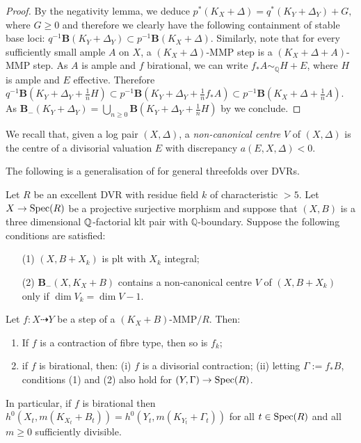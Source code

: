 	\begin{proof}
		By the negativity lemma, we deduce $p^*(K_X+\Delta)=q^*(K_Y+\Delta_Y)+G,$ where $G \geq 0$ and therefore we clearly have the following containment of stable base loci: $q^{-1}\mathbf{B}(K_Y+\Delta_Y) \subset p^{-1}\mathbf{B}(K_X+\Delta).$
		Similarly, note that for every sufficiently small ample $A$ on $X$,
		a $(K_X+\Delta)$-MMP step is a $(K_X+\Delta+A)$-MMP step. As $A$ is ample and $f$ birational, we can write $f_*A \sim_{\mathbb{Q}} H+E$, where $H$ is ample and $E$ effective. 
		Therefore  $q^{-1}\mathbf{B}(K_Y+\Delta_Y+\frac{1}{n}H) \subset p^{-1}\mathbf{B}(K_Y+\Delta_Y+ \frac{1}{n}f_*A)\subset  p^{-1}\mathbf{B}(K_X+\Delta+ \frac{1}{n}A) $.
		As $\mathbf{B}_{-}(K_Y+\Delta_Y)=\bigcup_{n \geq 0} \mathbf{B}(K_Y+\Delta_Y+\frac{1}{n}H)$ by \cite[Proposition 1.19]{asympt-baseloci} we conclude.
	\end{proof}

	We recall that, given a log pair $(X,\Delta)$, a \emph{non-canonical centre} $V$ of $(X,\Delta)$ is the centre of a divisorial valuation $E$ with discrepancy $a(E, X, \Delta)<0$.  

The following is a generalisation of \cite[Lemma 3.1]{HMX18} for general threefolds over DVRs. 
	
	\begin{proposition}\label{lemma:MMP_in_fam2}
		Let $R$ be an excellent DVR with residue field $k$ of characteristic $>5$. Let $X \to \operatorname{Spec}(R)$ be a projective surjective morphism and suppose that $(X,B)$ is a three dimensional $\mathbb{Q}$-factorial klt pair with $\mathbb{Q}$-boundary.
		Suppose the following conditions are satisfied:
		\begin{itemize}
		\item[(1)] $(X,B+X_k)$ is plt with $X_k$ integral;
		\item[(2)] ${\mathbf{B}_{-}(X, K_{X}+B)}$ contains a non-canonical centre $V$ of $(X,B+X_{k})$ only if $\dim V_{k}=\dim V -1$.
		\end{itemize}
		Let $f \colon X\dashrightarrow Y$ be a step of a $(K_X+B)$-MMP$/R$. Then:
		\begin{enumerate}
			\item  If $f$ is a contraction of fibre type, then so is $f_k$;
			\item if $f$ is birational, then:
			\subitem(i) $f$ is a divisorial contraction;
			\subitem(ii) letting $\Gamma:=f_\ast B$, conditions (1) and (2) also hold for $(Y,\Gamma)\to\operatorname{Spec} (R)$.
		\end{enumerate} 
		In particular, if $f$ is birational then $h^0(X_t,m(K_{X_t}+B_t))=h^0(Y_t,m(K_{Y_t}+\Gamma_t))$ for all $t\in\operatorname{Spec} (R)$ and all $m\geq 0$ sufficiently divisible.
	\end{proposition}
	

